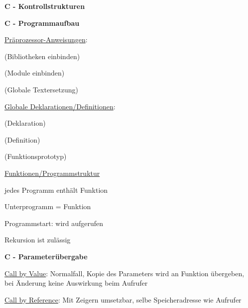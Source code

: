 \textbf{C - Kontrollstrukturen}
\begin{items}
  \item {}
  \item {}
  \item {}
  \item {}
  \item {}
\end{items}

\newpage

\textbf{C - Programmaufbau}
\begin{enumeration}
  \item \underline{Präprozessor-Anweisungen}:
  \begin{enumeration}
    \item {} (Bibliotheken einbinden)
    \item {} (Module einbinden)
    \item {} (Globale Textersetzung)
  \end{enumeration}
  \item \underline{Globale Deklarationen/Definitionen}:
  \begin{enumeration}
    \item {} (Deklaration)
    \item {} (Definition)
    \item {} (Funktionsprototyp)
  \end{enumeration}

  \item \underline{Funktionen/Programmstruktur}
  \begin{items}
    \item {}
    \item jedes Programm enthält Funktion 
    \item Unterprogramm = Funktion
    \item Programmstart:  wird aufgerufen
    \item Rekursion ist zulässig
  \end{items}
\end{enumeration}

\textbf{C - Parameterübergabe}
\begin{enumeration}
  \item \underline{Call by Value}: Normalfall, Kopie des Parameters wird an Funktion übergeben, bei Änderung keine Auswirkung beim Aufrufer
  \item \underline{Call by Reference}: Mit Zeigern umsetzbar, selbe Speicheradresse wie Aufrufer
\end{enumeration}

